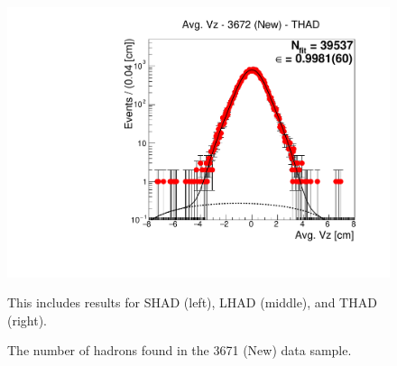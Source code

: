 \begin{figure}[H]
\includegraphics[scale=0.25]{figures/plots/nonDDbar_fit_results/3650_new/fit_new_3671_data_THAD.pdf}
\caption{The number of hadrons found in the 3671 (New) data sample.}
{This includes results for SHAD (left), LHAD (middle), and THAD (right).}
\label{fig:hadron_fits_3671_new}
\end{figure}



